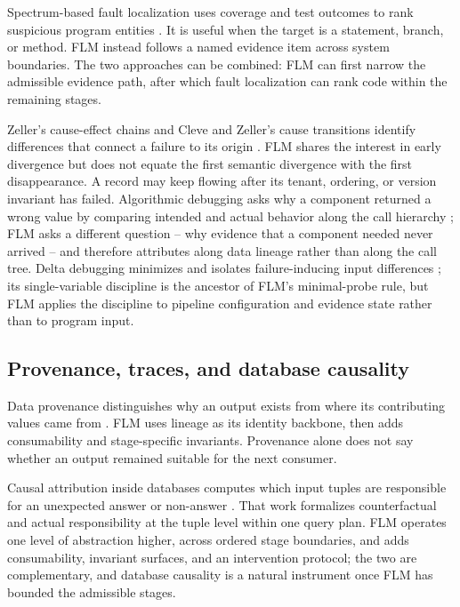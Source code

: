 \documentclass[10pt]{article}
\begin{document}
Spectrum-based fault localization uses coverage and test outcomes to rank suspicious program entities \cite{jones2002visualization,abreu2009spectrum}. It is useful when the target is a statement, branch, or method. FLM instead follows a named evidence item across system boundaries. The two approaches can be combined: FLM can first narrow the admissible evidence path, after which fault localization can rank code within the remaining stages.

Zeller's cause-effect chains and Cleve and Zeller's cause transitions identify differences that connect a failure to its origin \cite{zeller2002causeeffect,cleve2005locating}. FLM shares the interest in early divergence but does not equate the first semantic divergence with the first disappearance. A record may keep flowing after its tenant, ordering, or version invariant has failed. Algorithmic debugging asks why a component returned a wrong value by comparing intended and actual behavior along the call hierarchy \cite{shapiro1983algorithmic}; FLM asks a different question -- why evidence that a component needed never arrived -- and therefore attributes along data lineage rather than along the call tree. Delta debugging minimizes and isolates failure-inducing input differences \cite{zeller2002simplifying}; its single-variable discipline is the ancestor of FLM's minimal-probe rule, but FLM applies the discipline to pipeline configuration and evidence state rather than to program input.

\subsection{Provenance, traces, and database causality}

Data provenance distinguishes why an output exists from where its contributing values came from \cite{buneman2001whywhere,cheney2009provenance}. FLM uses lineage as its identity backbone, then adds consumability and stage-specific invariants. Provenance alone does not say whether an output remained suitable for the next consumer.

Causal attribution inside databases computes which input tuples are responsible for an unexpected answer or non-answer \cite{meliou2010causality}. That work formalizes counterfactual and actual responsibility at the tuple level within one query plan. FLM operates one level of abstraction higher, across ordered stage boundaries, and adds consumability, invariant surfaces, and an intervention protocol; the two are complementary, and database causality is a natural instrument once FLM has bounded the admissible stages.
\end{document}
